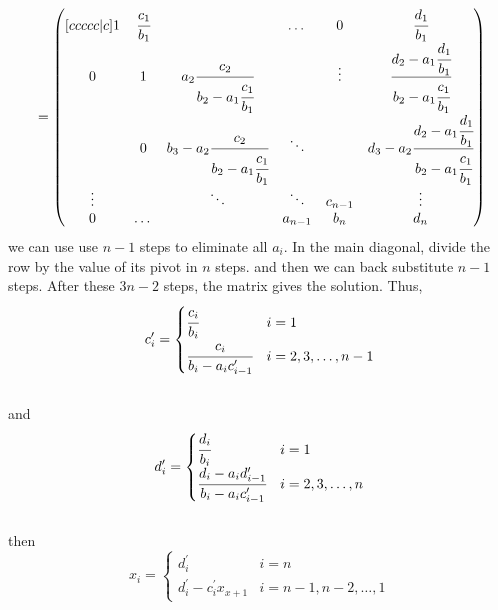 \documentclass{article}
\begin{document}
\begin{equation*}
\begin{aligned}
            &=
            \begin{pmatrix}[ccccc|c]
                1 & \cfrac{c_{1}}{b_1} &  & \dots & 0 & \cfrac{d_{1}}{b_1}\\
                0 & 1 & a_{2}\cfrac{c_{2}}{b_2 - a_{1}\cfrac{c_{1}}{b_1}} & & \vdots & \cfrac{d_2 - a_{1}\cfrac{d_{1}}{b_1}}{b_2 - a_{1}\cfrac{c_{1}}{b_1}}\\
                & 0 & b_3 - a_{2}\cfrac{c_{2}}{b_2 - a_{1}\cfrac{c_{1}}{b_1}}& \ddots & & d_3 - a_{2}\cfrac{d_2 - a_{1}\cfrac{d_{1}}{b_1}}{b_2 - a_{1}\cfrac{c_{1}}{b_1}}\\
                \vdots & & \ddots & \ddots & c_{n-1} & \vdots\\
                0 & \dots & & a_{n-1} & b_n & d_n\\
            \end{pmatrix}\\
        \end{aligned}
    \end{equation*}
    we can use use $n-1$ steps to eliminate all $a_i$. In the main diagonal, divide the row by the value of its pivot in $n$ steps. and then we can back substitute $n-1$ steps. After these $3n-2$ steps, the matrix gives the solution. Thus,
    \[
    c_{i}^{\prime}= 
    \begin{cases}
        \cfrac{c_{i}}{b_{i}} & i=1\\
        \cfrac{c_{i}}{b_{i}-a_{i}c_{i-1}^{\prime}}              & i=2,3,\dots,n-1
    \end{cases}
    \]\\
    and
    \[
    d_{i}^{\prime}= 
    \begin{cases}
        \cfrac{d_{i}}{b_{i}} & i=1\\
        \cfrac{d_{i}-a_{i}d_{i-1}^{\prime}}{b_{i}-a_{i}c_{i-1}^{\prime}} & i=2,3,\dots,n
    \end{cases}
    \]\\
    then
    \[
    x_{i}= 
    \begin{cases}
        d_{i}^{\prime} & i=n\\
        d_{i}^{\prime}-c_{i}^{\prime}x_{x+1} & i=n-1,n-2,\dots,1
    \end{cases} 
    \]
\end{document}

